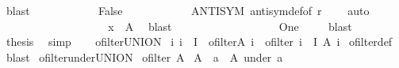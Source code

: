 \begin{isabellebody}
\ blast\isanewline
\ \ \ \ \ \ \ \ \ \ \isamarkupfalse%
\ False\isanewline
\ \ \ \ \ \ \ \ \ \ \isamarkupfalse%
\ ANTISYM\ antisym{\isacharunderscore}{\kern0pt}def{\isacharbrackleft}{\kern0pt}of\ r{\isacharbrackright}{\kern0pt}\ {\isacharasterisk}{\kern0pt}{\isacharasterisk}{\kern0pt}\ {\isacharasterisk}{\kern0pt}{\isacharasterisk}{\kern0pt}{\isacharasterisk}{\kern0pt}\ \isamarkupfalse%
\ auto\isanewline
\ \ \ \ \ \ \ \ \ \isacommand{{\isacharbraceright}{\kern0pt}}\isamarkupfalse%
\isanewline
\ \ \ \ \ \ \ \ \isamarkupfalse%
\ {\isachardoublequoteopen}x\ {\isasymin}\ A{\isachardoublequoteclose}\ \isamarkupfalse%
\ blast\isanewline
\ \ \ \ \ \ \isamarkupfalse%
\isanewline
\ \ \ \ \isamarkupfalse%
\isanewline
\ \ \ \ \isamarkupfalse%
\ \isamarkupfalse%
\ {\isacharquery}{\kern0pt}One\ \isamarkupfalse%
\ {}\ \isamarkupfalse%
\ blast\isanewline
\ \ \ \ \isamarkupfalse%
\ {\isacharquery}{\kern0pt}thesis\ \isamarkupfalse%
\ simp\isanewline
\ \ \isamarkupfalse%
\isanewline
{}\isamarkupfalse%
%
\endisatagproof
{\isafoldproof}%
%
\isadelimproof
\isanewline
%
\endisadelimproof
\isanewline
{}\isamarkupfalse%
\ ofilter{\isacharunderscore}{\kern0pt}UNION{\isacharcolon}{\kern0pt}\isanewline
{\isachardoublequoteopen}{\isacharparenleft}{\kern0pt}{\isasymAnd}\ i{\isachardot}{\kern0pt}\ i\ {\isasymin}\ I\ {\isasymLongrightarrow}\ ofilter{\isacharparenleft}{\kern0pt}A\ i{\isacharparenright}{\kern0pt}{\isacharparenright}{\kern0pt}\ {\isasymLongrightarrow}\ ofilter\ {\isacharparenleft}{\kern0pt}{\isasymUnion}i\ {\isasymin}\ I{\isachardot}{\kern0pt}\ A\ i{\isacharparenright}{\kern0pt}{\isachardoublequoteclose}\isanewline
%
\isadelimproof
%
\endisadelimproof
%
\isatagproof
{}\isamarkupfalse%
\ ofilter{\isacharunderscore}{\kern0pt}def\ \isamarkupfalse%
\ blast%
\endisatagproof
{\isafoldproof}%
%
\isadelimproof
\isanewline
%
\endisadelimproof
\isanewline
{}\isamarkupfalse%
\ ofilter{\isacharunderscore}{\kern0pt}under{\isacharunderscore}{\kern0pt}UNION{\isacharcolon}{\kern0pt}\isanewline
{}\ {\isachardoublequoteopen}ofilter\ A{\isachardoublequoteclose}\isanewline
{}\ {\isachardoublequoteopen}A\ {\isacharequal}{\kern0pt}\ {\isacharparenleft}{\kern0pt}{\isasymUnion}a\ {\isasymin}\ A{\isachardot}{\kern0pt}\ under\ a{\isacharparenright}{\kern0pt}{\isachardoublequoteclose}\isanewline

\end{isabellebody}
